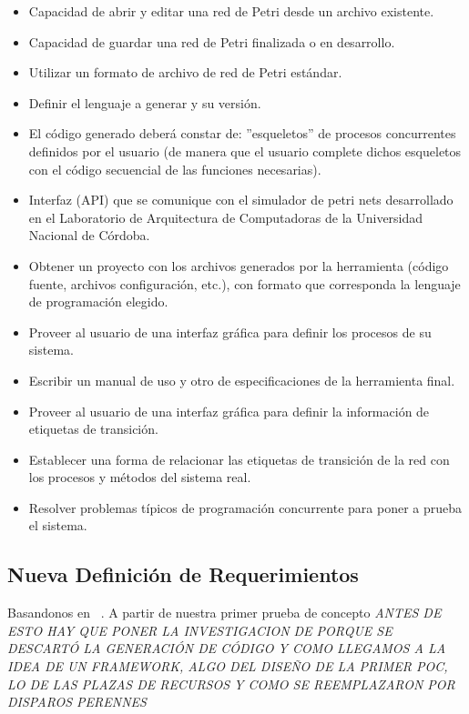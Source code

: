 \begin{itemize}
    \item Capacidad de abrir y editar una red de Petri desde un archivo existente.
    \item Capacidad de guardar una red de Petri finalizada o en desarrollo.
    \item Utilizar un formato de archivo de red de Petri estándar.
    \item Definir el lenguaje a generar y su versión.
    \item El código generado deberá constar de: ”esqueletos” de procesos
    concurrentes definidos por el usuario (de manera que el usuario complete dichos esqueletos con el código secuencial de las funciones necesarias).
    \item Interfaz (API) que se comunique con el simulador de petri nets
    desarrollado en el Laboratorio de Arquitectura de Computadoras de la
    Universidad Nacional de Córdoba.
    \item Obtener un proyecto con los archivos generados por la herramienta
    (código fuente, archivos configuración, etc.), con formato que corresponda la lenguaje de programación elegido.
    \item Proveer al usuario de una interfaz gráfica para definir los procesos
    de su sistema. 
    \item Escribir un manual de uso y otro de especificaciones de la herramienta final.
    \item Proveer al usuario de una interfaz gráfica para definir la información
    de etiquetas de transición.
    \item Establecer una forma de relacionar las etiquetas de transición de la
    red con los procesos y métodos del sistema real.
    \item  Resolver problemas típicos de programación concurrente para poner a
    prueba el sistema.
\end{itemize}




\subsection{Nueva Definición de Requerimientos}
Basandonos en ~\cite{chimp}. A partir de nuestra primer prueba de concepto
\emph{\color{red} ANTES DE ESTO HAY QUE PONER LA INVESTIGACION DE PORQUE SE
DESCARTÓ LA GENERACIÓN DE CÓDIGO Y COMO LLEGAMOS A LA IDEA DE UN FRAMEWORK, ALGO
DEL DISEÑO DE LA PRIMER POC, LO DE LAS PLAZAS DE RECURSOS Y COMO SE REEMPLAZARON POR DISPAROS PERENNES}

